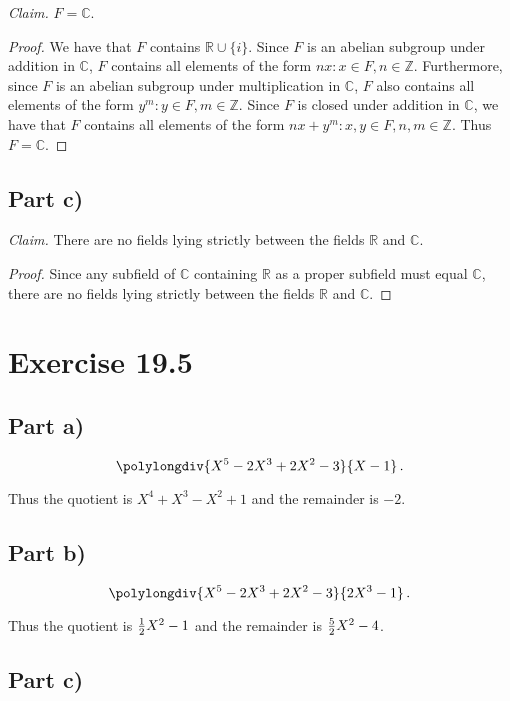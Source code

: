 \documentclass{abrice}
\newcommand{\Z}{\mathbb{Z}}
\newcommand{\R}{\mathbb{R}}
\renewcommand{\C}{\mathbb{C}}
\begin{document}
\emph{Claim.} $F = \C$.

\begin{proof}
  We have that $F$ contains $\R \cup \{i\}$. Since $F$ is an abelian subgroup
  under addition in $\C$, $F$ contains all elements of the form $nx : x \in F, n
  \in \Z$. Furthermore, since $F$ is an abelian subgroup under multiplication in
  $\C$, $F$ also contains all elements of the form $y^m : y \in F, m \in \Z$.
  Since $F$ is closed under addition in $\C$, we have that $F$ contains all
  elements of the form $nx + y^m : x,y \in F, n,m \in \Z$. Thus $F = \C$.
\end{proof}

\subsection{Part c)}

\emph{Claim.} There are no fields lying strictly between the fields $\R$ and
$\C$.

\begin{proof}
  Since any subfield of $\C$ containing $\R$ as a proper subfield must equal
  $\C$, there are no fields lying strictly between the fields $\R$ and $\C$.
\end{proof}

\section{Exercise 19.5}

\subsection{Part a)}

\[
\polylongdiv{X^5 - 2X^3 + 2X^2 - 3}{X - 1}\, .
\]

Thus the quotient is $X^4 + X^3 - X^2 + 1$ and the remainder is $-2$.

\subsection{Part b)}

\[
\polylongdiv{X^5 - 2X^3 + 2X^2 - 3}{2X^3 - 1}\, .
\]

Thus the quotient is ${1 \over 2} X^2 - 1$ and the remainder is ${5 \over 2} X^2
- 4$.

\subsection{Part c)}
\end{document}

